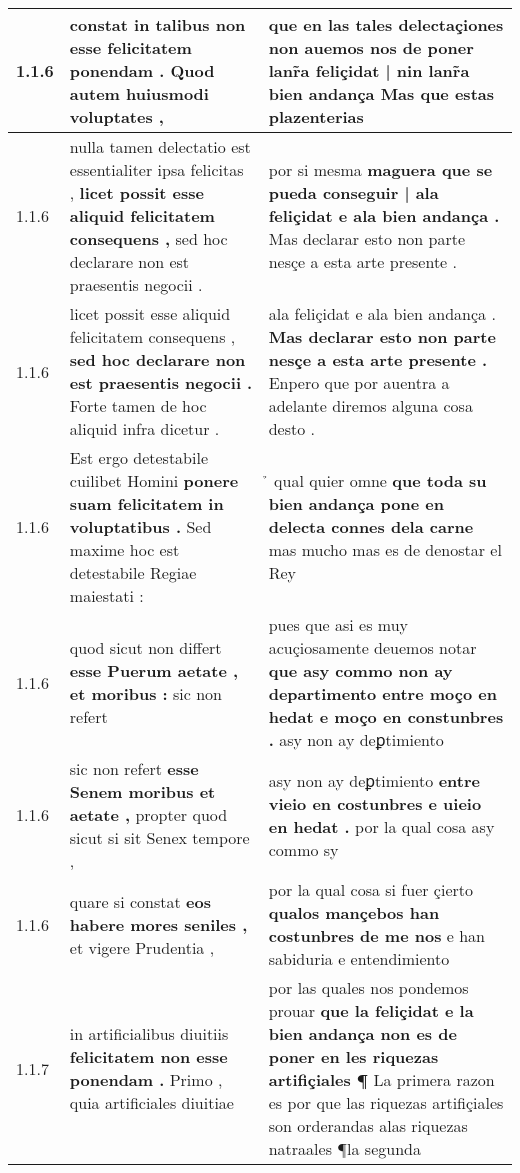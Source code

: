 \begin{tabular}{|p{1cm}|p{6.5cm}|p{6.5cm}|}
1.1.6 & constat in talibus \textbf{ non esse felicitatem ponendam . } Quod autem huiusmodi voluptates , & que en las tales delectaçiones \textbf{ non auemos nos de poner lanr̃a feliçidat | nin lanr̃a bien andança } Mas que estas plazenterias \\\hline
1.1.6 & nulla tamen delectatio est essentialiter ipsa felicitas , \textbf{ licet possit esse aliquid felicitatem consequens , } sed hoc declarare non est praesentis negocii . & por si mesma \textbf{ maguera que se pueda conseguir | ala feliçidat e ala bien andança . } Mas declarar esto non parte nesçe a esta arte presente . \\\hline
1.1.6 & licet possit esse aliquid felicitatem consequens , \textbf{ sed hoc declarare non est praesentis negocii . } Forte tamen de hoc aliquid infra dicetur . & ala feliçidat e ala bien andança . \textbf{ Mas declarar esto non parte nesçe a esta arte presente . } Enpero que por auentra a adelante diremos alguna cosa desto . \\\hline
1.1.6 & Est ergo detestabile cuilibet Homini \textbf{ ponere suam felicitatem in voluptatibus . } Sed maxime hoc est detestabile Regiae maiestati : & ̉ qual quier omne \textbf{ que toda su bien andança pone en delecta connes dela carne } mas mucho mas es de denostar el Rey \\\hline
1.1.6 & quod sicut non differt \textbf{ esse Puerum aetate , et moribus : } sic non refert & pues que asi es muy acuçiosamente deuemos notar \textbf{ que asy commo non ay departimento entre moço en hedat e moço en constunbres . } asy non ay deꝑtimiento \\\hline
1.1.6 & sic non refert \textbf{ esse Senem moribus et aetate , } propter quod sicut si sit Senex tempore , & asy non ay deꝑtimiento \textbf{ entre vieio en costunbres e uieio en hedat . } por la qual cosa asy commo sy \\\hline
1.1.6 & quare si constat \textbf{ eos habere mores seniles , } et vigere Prudentia , & por la qual cosa si fuer çierto \textbf{ qualos mançebos han costunbres de me nos } e han sabiduria e entendimiento \\\hline
1.1.7 & in artificialibus diuitiis \textbf{ felicitatem non esse ponendam . } Primo , quia artificiales diuitiae & por las quales nos pondemos prouar \textbf{ que la feliçidat e la bien andança non es de poner en les riquezas artifiçiales ¶ } La primera razon es por que las riquezas artifiçiales son orderandas alas riquezas natraales ¶la segunda \\\hline

\end{tabular}
